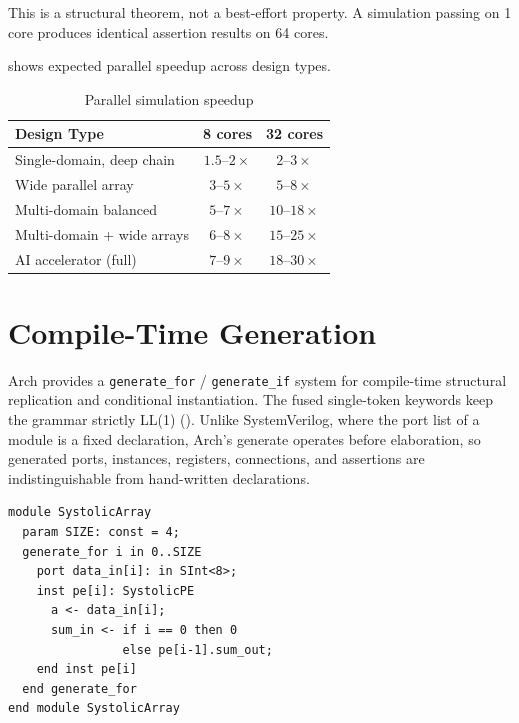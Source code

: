 \documentclass[11pt,twocolumn]{article}
\begin{document}
This is a structural theorem, not a best-effort property. A simulation passing on 1 core produces identical assertion results on 64 cores.

 shows expected parallel speedup across design types.

\begin{table}[H]
\centering
\caption{Parallel simulation speedup}
\label{tab:scaling}
\small
\begin{tabular}{@{}lcc@{}}
\toprule
\textbf{Design Type} & \textbf{8 cores} & \textbf{32 cores} \\
\midrule
Single-domain, deep chain & $1.5$--$2\times$ & $2$--$3\times$ \\
Wide parallel array & $3$--$5\times$ & $5$--$8\times$ \\
Multi-domain balanced & $5$--$7\times$ & $10$--$18\times$ \\
Multi-domain + wide arrays & $6$--$8\times$ & $15$--$25\times$ \\
AI accelerator (full) & $7$--$9\times$ & $18$--$30\times$ \\
\bottomrule
\end{tabular}
\end{table}

\section{Compile-Time Generation}\label{sec:generate}

Arch provides a \texttt{generate\_for} / \texttt{generate\_if} system for compile-time structural replication and conditional instantiation. The fused single-token keywords keep the grammar strictly LL(1) (). Unlike SystemVerilog, where the port list of a module is a fixed declaration, Arch's generate operates before elaboration, so generated ports, instances, registers, connections, and assertions are indistinguishable from hand-written declarations.

\begin{lstlisting}[language=Arch,caption={Generate-for iteration},label={lst:gen}]
module SystolicArray
  param SIZE: const = 4;
  generate_for i in 0..SIZE
    port data_in[i]: in SInt<8>;
    inst pe[i]: SystolicPE
      a <- data_in[i];
      sum_in <- if i == 0 then 0
                else pe[i-1].sum_out;
    end inst pe[i]
  end generate_for
end module SystolicArray
\end{lstlisting}
\end{document}
